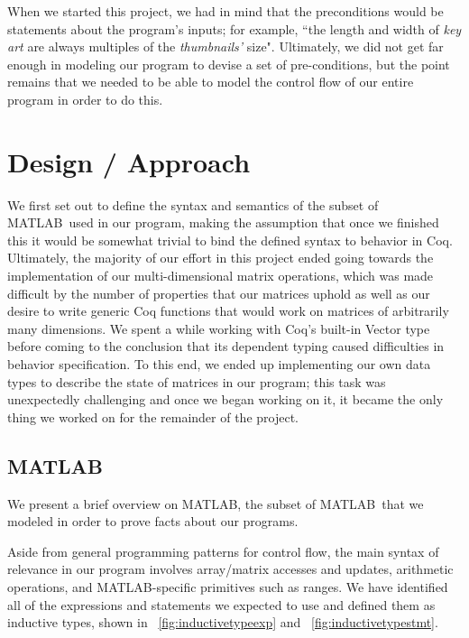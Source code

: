 \documentclass[11pt,conference]{IEEEtran}
\newcommand{\matlab}{MATLAB}
\newcommand{\mmatlab}{\textmu\matlab}
\theoremstyle{plain} %
\theoremstyle{definition}
\theoremstyle{remark}
\begin{document}
When we started this project, we had in mind that the preconditions would be statements about the program's inputs; for example, ``the length and width of \textit{key art} are always multiples of the \textit{thumbnails'} size". Ultimately, we did not get far enough in modeling our program to devise a set of pre-conditions, but the point remains that we needed to be able to model the control flow of our entire program in order to do this.

\section{Design / Approach}

We first set out to define the syntax and semantics of the subset of \matlab\ used in our program, making the assumption that once we finished this it would be somewhat trivial to bind the defined syntax to behavior in Coq. Ultimately, the majority of our effort in this project ended going towards the implementation of our multi-dimensional matrix operations, which was made difficult by the number of properties that our matrices uphold as well as our desire to write generic Coq functions that would work on matrices of arbitrarily many dimensions. We spent a while working with Coq's built-in \textsf{Vector} type before coming to the conclusion that its dependent typing caused difficulties in behavior specification. To this end, we ended up implementing our own data types to describe the state of matrices in our program; this task was unexpectedly challenging and once we began working on it, it became the only thing we worked on for the remainder of the project.


\subsection{\mmatlab}\label{S:mmatlab}

We present a brief overview on \mmatlab, the subset of \matlab\ that we modeled in
order to prove facts about our programs.

Aside from general programming patterns for control flow, the main syntax of
relevance in our program involves array/matrix accesses and updates, arithmetic
operations, and \matlab-specific primitives such as ranges. We have identified
all of the expressions and statements we expected to use and defined them as
inductive types, shown in \figurename~\ref{fig:inductivetypeexp} and
\figurename~\ref{fig:inductivetypestmt}.
\end{document}
